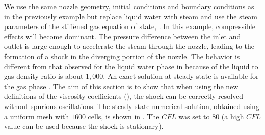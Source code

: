 We use the same nozzle geometry, initial conditions and boundary conditions as in the previously example but replace liquid water with steam and use the steam parameters of the stiffened gas equation of state, . In this example, compressible effects will become dominant. 
The pressure difference between the inlet and outlet is large enough to accelerate the steam through the nozzle, leading to the formation of a shock in the diverging portion of the nozzle. The behavior is different from that observed for the liquid water phase in  because of the liquid to gas density ratio is about $1,000$. An exact solution at steady state is available for the gas phase \cite{nozzle_exact}. The aim of this section is to show that when using the new definitions of the viscosity coefficients (), the shock can be correctly resolved without spurious oscillations. The steady-state numerical solution, obtained using a uniform mesh with $1600$ cells, is shown in . The $CFL$ was set to $80$ (a high $CFL$ value can be used because the shock is stationary).

